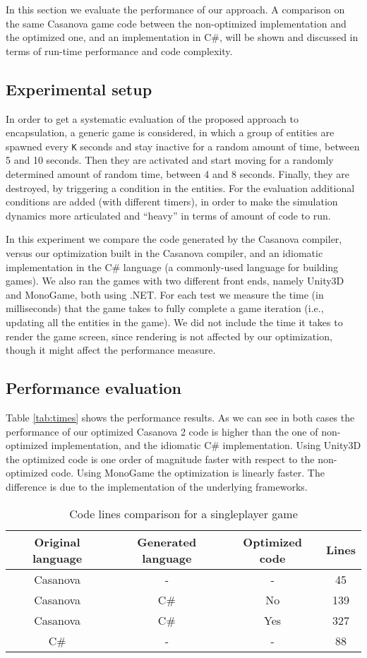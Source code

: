 In this section we evaluate the performance of our approach. A comparison on the same Casanova game code between the non-optimized implementation and the optimized one, and an implementation in C\#, will be shown and discussed in terms of run-time performance and code complexity.

\subsection{Experimental setup} In order to get a systematic evaluation of the proposed approach to encapsulation, a generic game is considered, in which a group of entities are spawned every \texttt{K} seconds and stay inactive for a random amount of time, between 5 and 10 seconds. Then they are activated and start moving for a randomly determined amount of random time, between 4 and 8 seconds. Finally, they are destroyed, by triggering a condition in the entities. For the evaluation additional conditions are added (with different timers), in order to make the simulation dynamics more articulated and ``heavy'' in terms of amount of code to run.


In this experiment we compare the code generated by the Casanova compiler, versus our optimization built in the Casanova compiler, and an idiomatic implementation in the C\# language (a commonly-used language for building games). We also ran the games with two different front ends, namely Unity3D and MonoGame, both using .NET.
For each test we measure the time (in milliseconds) that the game takes to fully complete a game iteration (i.e., updating all the entities in the game). We did not include the time it takes to render the game screen, since rendering is not affected by our optimization, though it might affect the performance measure.
\subsection{Performance evaluation} Table \ref{tab:times} shows the performance results. As we can see in both cases the performance of our optimized Casanova 2 code is higher than the one of non-optimized implementation, and the idiomatic C\# implementation. Using Unity3D the optimized code is one order of magnitude faster with respect to the non-optimized code. Using MonoGame the optimization is linearly faster. The difference is due to the implementation of the underlying frameworks.

\begin{table}[!ht]
\caption{Code lines comparison for a singleplayer game}
\label{tab:length}
\centering
\begin{tabular}{ @{}|c|c|c|c|@{} }
\hline
  Original language & Generated language & Optimized code & Lines \\ \hline
  Casanova & - & - & 45 \\
  Casanova & C\# & No & 139 \\
  Casanova & C\# & Yes & 327 \\
  C\# & - & - & 88 \\ \hline
\hline
\end{tabular}
\end{table}

